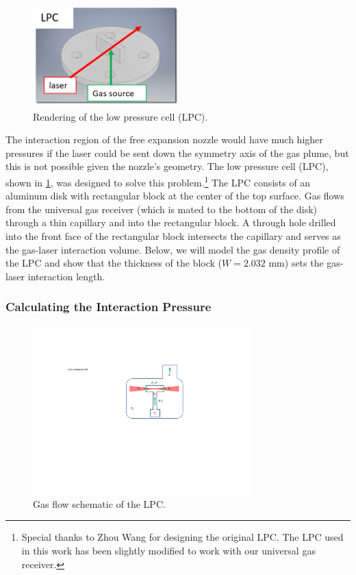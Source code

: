 \begin{figure}
	\centering
	\includegraphics[width=0.5\textwidth]{figures/chap3/LPC_diagram.png}
	\caption{Rendering of the low pressure cell (LPC).}
	\label{fig:LPC_diagram}
\end{figure}

The interaction region of the free expansion nozzle would have much higher pressures if the laser could be sent down the symmetry axis of the gas plume, but this is not possible given the nozzle's geometry. The low pressure cell (LPC), shown in \cref{fig:LPC_diagram}, was designed to solve this problem.\footnote{Special thanks to Zhou Wang \cite{wangMidinfraredStrongfieldLaser2018} for designing the original LPC. The LPC used in this work has been slightly modified to work with our universal gas receiver.} The LPC consists of an aluminum disk with rectangular block at the center of the top surface. Gas flows from the universal gas receiver (which is mated to the bottom of the disk) through a thin capillary and into the rectangular block. A through hole drilled into the front face of the rectangular block intersects the capillary and serves as the gas-laser interaction volume. Below, we will model the gas density profile of the LPC and show that the thickness of the block ($W = 2.032$ mm) sets the gas-laser interaction length.

\subsubsection{Calculating the Interaction Pressure}

\begin{figure}
	\centering
	\includegraphics[width=0.75\textwidth]{figures/chap3/LPC_schematic.pdf}
	\caption{Gas flow schematic of the LPC.}
	\label{fig:LPC_schematic}
\end{figure}

